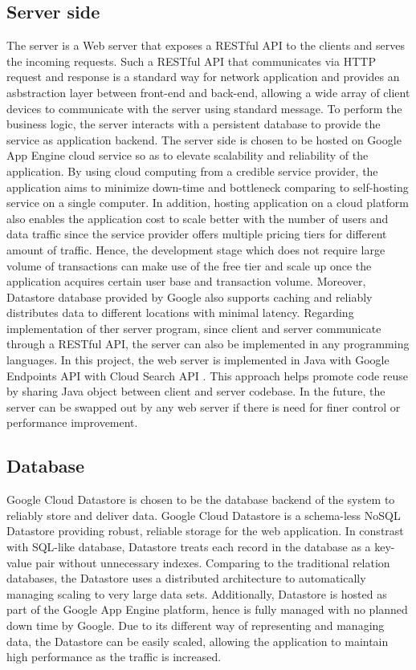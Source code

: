 \subsection{Server side}
The server is a Web server that exposes a RESTful API to the clients and serves the incoming requests. Such a RESTful
API that communicates via HTTP request and response is a standard way for network application and provides an
asbstraction layer between front-end and back-end, allowing a wide array of client devices to communicate with the
server using standard message. To perform the business logic, the server interacts with a persistent database to provide
the service as application backend.  The server side is chosen to be hosted on Google App Engine cloud service so as to
elevate scalability and reliability of the application. By using cloud computing from a credible service provider, the
application aims to minimize down-time and bottleneck comparing to self-hosting service on a single computer. In
addition, hosting application on a cloud platform also enables the application cost to scale better with the number of
users and data traffic since the service provider offers multiple pricing tiers for different amount of traffic. Hence,
the development stage which does not require large volume of transactions can make use of the free tier and scale up
once the application acquires certain user base and transaction volume. Moreover, Datastore database provided by Google
also supports caching and reliably distributes data to different locations with minimal latency.  Regarding
implementation of ther server program, since client and server communicate through a RESTful API, the server can also be
implemented in any programming languages. In this project, the web server is implemented in Java with Google Endpoints
API \cite{CloudEndpoints} with Cloud Search API \cite{SearchAPI}.  This approach helps promote code reuse by sharing
Java object between client and server codebase. In the future, the server can be swapped out by any web server if there
is need for finer control or performance improvement.

\subsection{Database}
Google Cloud Datastore is chosen to be the database backend of the system to reliably store and deliver data. Google
Cloud Datastore is a schema-less NoSQL Datastore providing robust, reliable storage for the web application. In
constrast with SQL-like database, Datastore treats each record in the database as a key-value pair without unnecessary
indexes. Comparing to the traditional relation databases, the Datastore uses a distributed architecture to automatically
managing scaling to very large data sets. Additionally, Datastore is hosted as part of the Google App Engine platform,
hence is fully managed with no planned down time by Google. Due to its different way of representing and managing data,
the Datastore can be easily scaled, allowing the application to maintain high performance as the traffic is increased.


